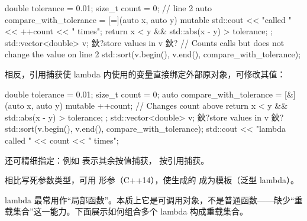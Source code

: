 \begin{code}
double tolerance = 0.01;
size_t count = 0; // line 2
auto compare_with_tolerance = [=](auto x, auto y) mutable {
  std::cout << "called " << ++count << " times\n";
  return x < y && std::abs(x - y) > tolerance;
};
std::vector<double> v;
鈥?store values in v 鈥?
// Counts calls but does not change the value on line 2
std::sort(v.begin(), v.end(), compare_with_tolerance);
\end{code}

相反，引用捕获使 lambda 内使用的变量直接绑定外部原对象，可修改其值：

\begin{code}
double tolerance = 0.01;
size_t count = 0;
auto compare_with_tolerance = [&](auto x, auto y) mutable {
  ++count; // Changes count above
  return x < y && std::abs(x - y) > tolerance;
};
std::vector<double> v;
鈥?store values in v 鈥?
std::sort(v.begin(), v.end(), compare_with_tolerance);
std::cout << "lambda called " << count << " times\n";
\end{code}

还可精细指定：例如 \cii{[=,&count]} 表示其余按值捕获， 按引用捕获。

相比写死参数类型，可用  形参（C++14），使生成的  成为模板（泛型 lambda）。

lambda 最常用作“局部函数”。本质上它是可调用对象，不是普通函数——缺少“重载集合”这一能力。下面展示如何组合多个 lambda 构成重载集合。

